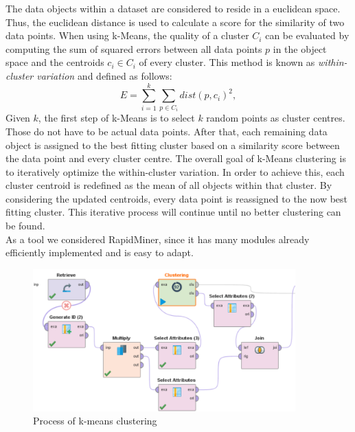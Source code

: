 	The data objects within a dataset are considered to reside in a euclidean space. Thus, the euclidean distance is used to calculate a score for the similarity of two data points. When using k-Means, the quality of a cluster $C_i$ can be evaluated by computing the sum of squared errors between all data points $p$ in the object space and the centroids $c_i \in C_i$ of every cluster. This method is known as \textit{within-cluster variation} \cite{data_mining} and defined as follows: 
	\begin{equation}
		E = \sum_{i=1}^{k} \sum_{p \in C_i} dist(p, c_i)^2,
	\end{equation}
	Given $k$, the first step of k-Means is to select $k$ random points as cluster centres. Those do not have to be actual data points.
	After that, each remaining data object is assigned to the best fitting cluster based on a similarity score between the data point and every cluster centre. The overall goal of k-Means clustering is to iteratively optimize the within-cluster variation. In order to achieve this, each cluster centroid is redefined as the mean of all objects within that cluster. By considering the updated centroids, every data point is reassigned to the now best fitting cluster. This iterative process will continue until no better clustering can be found.\\
	As a tool we considered RapidMiner, since it has many modules already efficiently implemented and is easy to adapt.
	\vspace*{-2em}
	\begin{figure}[!htbp]
		\centering
		\includegraphics[width=0.9\textwidth]{ClusteringRapid.PNG}
		\caption{Process of k-means clustering}
		\label{fig: kclust}
		\vspace*{-2em}
	\end{figure}

